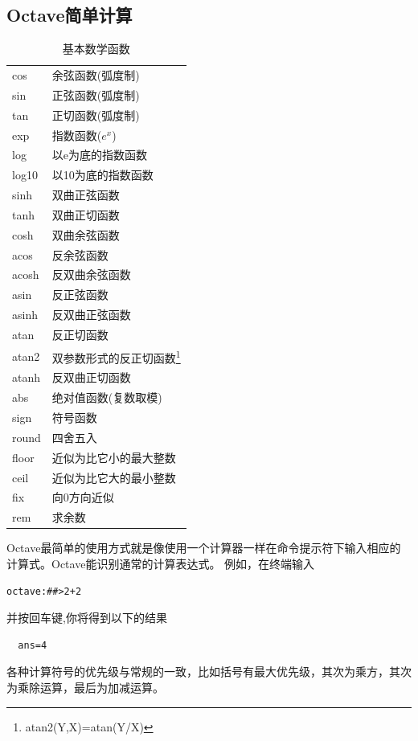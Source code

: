 \documentclass[UTF8,adobefonts]{ctexart}
\begin{document}
\subsection{Octave简单计算}
\begin{table}[htbp]
\caption{基本数学函数}
\label{tb:basicfunc}
\centering
\begin{tabular}{p{100pt}p{200pt}}
\hline
cos 	& 余弦函数(弧度制) \\
sin 	& 正弦函数(弧度制) \\
tan 	& 正切函数(弧度制) \\
exp 	& 指数函数($e^x$)\\
log 	& 以e为底的指数函数 \\
log10 	& 以10为底的指数函数 \\
sinh 	& 双曲正弦函数 \\
tanh 	& 双曲正切函数 \\
cosh 	& 双曲余弦函数 \\
acos 	& 反余弦函数 \\
acosh 	& 反双曲余弦函数 \\
asin	& 反正弦函数 \\
asinh	& 反双曲正弦函数 \\
atan	& 反正切函数 \\
atan2	& 双参数形式的反正切函数\footnote{atan2(Y,X)=atan(Y/X)} \\
atanh	& 反双曲正切函数 \\
\hline
abs	& 绝对值函数(复数取模) \\
sign	& 符号函数 \\
round	& 四舍五入\\
floor	& 近似为比它小的最大整数 \\
ceil	& 近似为比它大的最小整数 \\
fix	& 向0方向近似 \\
rem	& 求余数 \\
\hline
\end{tabular}
\end{table}
Octave最简单的使用方式就是像使用一个计算器一样在命令提示符下输入相应的计算式。Octave能识别通常的计算表达式。
例如，在终端输入
\begin{verbatim}
octave:##>2+2 
\end{verbatim}
并按回车键,你将得到以下的结果
\begin{verbatim}
  ans=4
\end{verbatim}
各种计算符号的优先级与常规的一致，比如括号有最大优先级，其次为乘方，其次为乘除运算，最后为加减运算。
\end{document}
